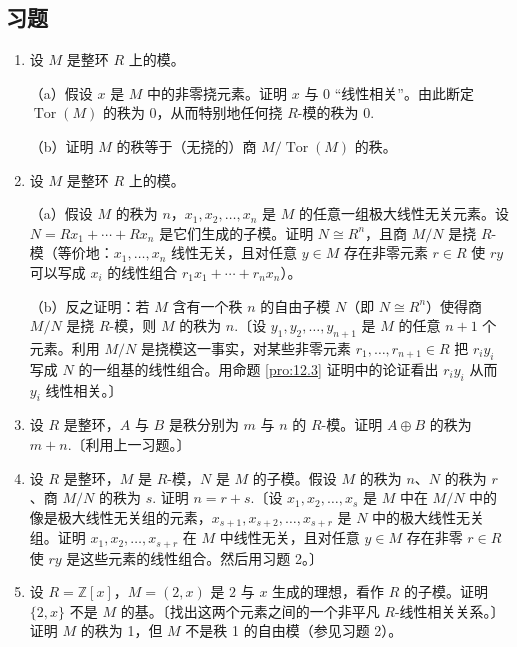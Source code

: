 \subsection*{习题}

\begin{enumerate}
\item 设 \(M\) 是整环 \(R\) 上的模。

（a）假设 \(x\) 是 \(M\) 中的非零挠元素。证明 \(x\) 与 0 “线性相关”。由此断定 \(\operatorname{Tor}(M)\) 的秩为 0，从而特别地任何挠 \(R\)-模的秩为 0.

（b）证明 \(M\) 的秩等于（无挠的）商 \(M/\operatorname{Tor}(M)\) 的秩。

\item 设 \(M\) 是整环 \(R\) 上的模。

（a）假设 \(M\) 的秩为 \(n\)，\(x_1, x_2, \ldots, x_n\) 是 \(M\) 的任意一组极大线性无关元素。设 \(N = Rx_1+\cdots+Rx_n\) 是它们生成的子模。证明 \(N \cong R^n\)，且商 \(M/N\) 是挠 \(R\)-模（等价地：\(x_1, \ldots, x_n\) 线性无关，且对任意 \(y \in M\) 存在非零元素 \(r \in R\) 使 \(ry\) 可以写成 \(x_i\) 的线性组合 \(r_1x_1+\cdots+r_nx_n\)）。

（b）反之证明：若 \(M\) 含有一个秩 \(n\) 的自由子模 \(N\)（即 \(N \cong R^n\)）使得商 \(M/N\) 是挠 \(R\)-模，则 \(M\) 的秩为 \(n\).〔设 \(y_1, y_2, \ldots, y_{n+1}\) 是 \(M\) 的任意 \(n+1\) 个元素。利用 \(M/N\) 是挠模这一事实，对某些非零元素 \(r_1, \ldots, r_{n+1} \in R\) 把 \(r_iy_i\) 写成 \(N\) 的一组基的线性组合。用命题 \ref{pro:12.3} 证明中的论证看出 \(r_iy_i\) 从而 \(y_i\) 线性相关。〕

\item 设 \(R\) 是整环，\(A\) 与 \(B\) 是秩分别为 \(m\) 与 \(n\) 的 \(R\)-模。证明 \(A \oplus B\) 的秩为 \(m+n\).〔利用上一习题。〕

\item 设 \(R\) 是整环，\(M\) 是 \(R\)-模，\(N\) 是 \(M\) 的子模。假设 \(M\) 的秩为 \(n\)、\(N\) 的秩为 \(r\)、商 \(M/N\) 的秩为 \(s\). 证明 \(n = r+s\).〔设 \(x_1, x_2, \ldots, x_s\) 是 \(M\) 中在 \(M/N\) 中的像是极大线性无关组的元素，\(x_{s+1}, x_{s+2}, \ldots, x_{s+r}\) 是 \(N\) 中的极大线性无关组。证明 \(x_1, x_2, \ldots, x_{s+r}\) 在 \(M\) 中线性无关，且对任意 \(y \in M\) 存在非零 \(r \in R\) 使 \(ry\) 是这些元素的线性组合。然后用习题 2。〕

\item 设 \(R = \mathbb{Z}[x]\)，\(M = (2, x)\) 是 \(2\) 与 \(x\) 生成的理想，看作 \(R\) 的子模。证明 \(\{2, x\}\) 不是 \(M\) 的基。〔找出这两个元素之间的一个非平凡 \(R\)-线性相关关系。〕证明 \(M\) 的秩为 1，但 \(M\) 不是秩 1 的自由模（参见习题 2）。


\end{enumerate}
